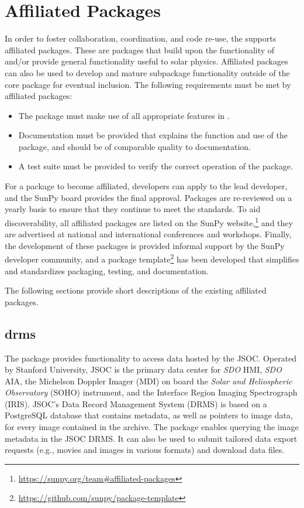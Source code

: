 \section{Affiliated Packages}
\label{sec:affil_package}

In order to foster collaboration, coordination, and code re-use, the \sunpyproj supports affiliated packages.
These are \python packages that build upon the functionality of \sunpypkg and/or provide general functionality useful to solar physics.
Affiliated packages can also be used to develop and mature subpackage functionality outside of the \sunpypkg core package for eventual inclusion.
The following requirements must be met by affiliated packages:
\begin{itemize}
    \item The package must make use of all appropriate features in \sunpypkg.
    \item Documentation must be provided that explains the function and use of the package, and should be of comparable quality to \sunpypkg documentation.
    \item A test suite must be provided to verify the correct operation of the package.
\end{itemize}
For a package to become affiliated, developers can apply to the lead developer, and the SunPy board provides the final approval.
Packages are re-reviewed on a yearly basis to ensure that they continue to meet the standards.
To aid discoverability, all affiliated packages are listed on the SunPy website,\footnote{\url{https://sunpy.org/team\#affiliated-packages}} and they are advertised at national and international conferences and workshops.
Finally, the development of these packages is provided informal support by the SunPy developer community, and
a package template\footnote{\url{https://github.com/sunpy/package-template}} has been developed that simplifies and standardizes packaging, testing, and documentation.

The following sections provide short descriptions of the existing affiliated packages.

\subsection{drms}
\label{sec:drms}

The  \citep{Glogowski2019drms} package provides functionality to access data hosted by the JSOC.
Operated by Stanford University, JSOC is the primary data center for \textit{SDO} HMI, \textit{SDO} AIA, the Michelson Doppler Imager (MDI) on board the \textit{Solar and Heliospheric Observatory} (SOHO) instrument, and the Interface Region Imaging Spectrograph (IRIS).
JSOC's Data Record Management System (DRMS) is based on a PostgreSQL database that contains metadata, as well as pointers to image data, for every image contained in the archive.
The  package enables querying the image metadata in the JSOC DRMS.
It can also be used to submit tailored data export requests (e.g., movies and images in various formats) and download data files.

